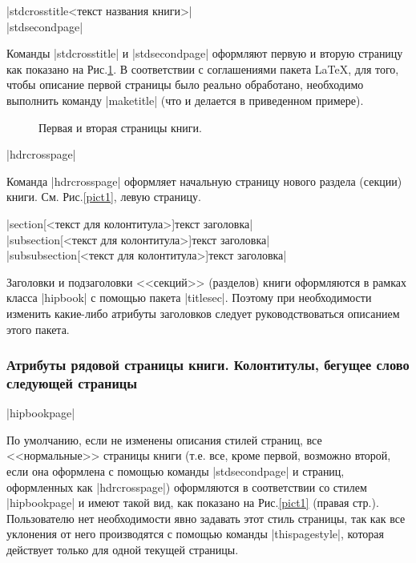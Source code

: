 \documentclass{ltxguide}
\begin{document}
\begin{decl}
  |stdcrosstitle{<текст названия книги>}|\\
  |stdsecondpage|
\end{decl}

Команды |stdcrosstitle| и |stdsecondpage| оформляют первую и вторую страницу 
как показано на Рис.\ref{pict2}. В соответствии с соглашениями
пакета \LaTeX, для того, чтобы описание первой страницы было реально
обработано, необходимо выполнить команду |maketitle| (что и делается в
приведенном примере).

\begin{figure}[h]
  \begin{center}
  \end{center}
  \caption{\label{pict2}Первая и вторая страницы книги.}
\end{figure}

\begin{decl}
  |hdrcrosspage|
\end{decl}

Команда |hdrcrosspage| оформляет начальную страницу нового раздела (секции)
книги. См. Рис.\ref{pict1}, левую страницу.

\begin{decl}
  |section[<текст для колонтитула>]{текст заголовка}|\\
  |subsection[<текст для колонтитула>]{текст заголовка}|\\
  |subsubsection[<текст для колонтитула>]{текст заголовка}|
\end{decl}

Заголовки и подзаголовки <<секций>> (разделов) книги оформляются в рамках
класса |hipbook| с помощью пакета |titlesec|. Поэтому при необходимости
изменить какие-либо атрибуты заголовков следует руководствоваться
описанием этого пакета.

\subsubsection{Атрибуты рядовой страницы книги. Колонтитулы, бегущее слово
следующей страницы}

\begin{decl}
  |hipbookpage|
\end{decl}

По умолчанию, если не изменены описания стилей страниц, все
<<нормальные>> страницы книги (т.е. все, кроме первой, возможно
второй, если она оформлена с помощью команды |stdsecondpage| и
страниц, оформленных как |hdrcrosspage|) оформляются в соответствии со
стилем |hipbookpage| и имеют такой вид, как показано на
Рис.\ref{pict1} (правая стр.). Пользователю нет необходимости явно задавать этот
стиль страницы, так как все уклонения от него производятся с
помощью команды |thispagestyle|, которая действует только для одной
текущей страницы. 
\end{document}
